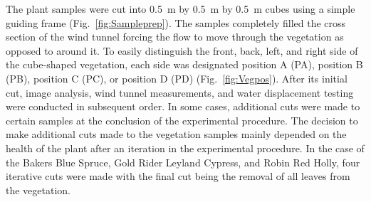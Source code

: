 \documentclass[12pt]{article}
\begin{document}
The plant samples were cut into 0.5~\si{m} by 0.5~\si{m} by 0.5~\si{m} cubes using a simple guiding frame  (Fig.~\ref{fig:Sampleprep}). The samples completely filled the cross section of the wind tunnel forcing the flow to move through the vegetation as opposed to around it. To easily distinguish the front, back, left, and right side of the cube-shaped vegetation, each side was designated position A (PA), position B (PB), position C (PC), or position D (PD) (Fig.~\ref{fig:Vegpos}). After its initial cut, image analysis, wind tunnel measurements, and water displacement testing were conducted in subsequent order. In some cases, additional cuts were made to certain samples at the conclusion of the experimental procedure. The decision to make additional cuts made to the vegetation samples mainly depended on the health of the plant after an iteration in the experimental procedure. In the case of the Bakers Blue Spruce, Gold Rider Leyland Cypress, and Robin Red Holly, four iterative cuts were made with the final cut being the removal of all leaves from the vegetation.
\end{document}
